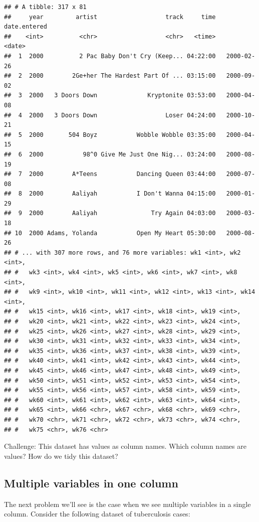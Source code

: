 \documentclass[]{book}
\theoremstyle{definition}
\theoremstyle{definition}
\theoremstyle{remark}
\begin{document}
\begin{verbatim}
## # A tibble: 317 x 81
##     year         artist                   track     time date.entered
##    <int>          <chr>                   <chr>   <time>       <date>
##  1  2000          2 Pac Baby Don't Cry (Keep... 04:22:00   2000-02-26
##  2  2000        2Ge+her The Hardest Part Of ... 03:15:00   2000-09-02
##  3  2000   3 Doors Down              Kryptonite 03:53:00   2000-04-08
##  4  2000   3 Doors Down                   Loser 04:24:00   2000-10-21
##  5  2000       504 Boyz           Wobble Wobble 03:35:00   2000-04-15
##  6  2000           98^0 Give Me Just One Nig... 03:24:00   2000-08-19
##  7  2000        A*Teens           Dancing Queen 03:44:00   2000-07-08
##  8  2000        Aaliyah           I Don't Wanna 04:15:00   2000-01-29
##  9  2000        Aaliyah               Try Again 04:03:00   2000-03-18
## 10  2000 Adams, Yolanda           Open My Heart 05:30:00   2000-08-26
## # ... with 307 more rows, and 76 more variables: wk1 <int>, wk2 <int>,
## #   wk3 <int>, wk4 <int>, wk5 <int>, wk6 <int>, wk7 <int>, wk8 <int>,
## #   wk9 <int>, wk10 <int>, wk11 <int>, wk12 <int>, wk13 <int>, wk14 <int>,
## #   wk15 <int>, wk16 <int>, wk17 <int>, wk18 <int>, wk19 <int>,
## #   wk20 <int>, wk21 <int>, wk22 <int>, wk23 <int>, wk24 <int>,
## #   wk25 <int>, wk26 <int>, wk27 <int>, wk28 <int>, wk29 <int>,
## #   wk30 <int>, wk31 <int>, wk32 <int>, wk33 <int>, wk34 <int>,
## #   wk35 <int>, wk36 <int>, wk37 <int>, wk38 <int>, wk39 <int>,
## #   wk40 <int>, wk41 <int>, wk42 <int>, wk43 <int>, wk44 <int>,
## #   wk45 <int>, wk46 <int>, wk47 <int>, wk48 <int>, wk49 <int>,
## #   wk50 <int>, wk51 <int>, wk52 <int>, wk53 <int>, wk54 <int>,
## #   wk55 <int>, wk56 <int>, wk57 <int>, wk58 <int>, wk59 <int>,
## #   wk60 <int>, wk61 <int>, wk62 <int>, wk63 <int>, wk64 <int>,
## #   wk65 <int>, wk66 <chr>, wk67 <chr>, wk68 <chr>, wk69 <chr>,
## #   wk70 <chr>, wk71 <chr>, wk72 <chr>, wk73 <chr>, wk74 <chr>,
## #   wk75 <chr>, wk76 <chr>
\end{verbatim}

Challenge: This dataset has values as column names. Which column names
are values? How do we tidy this dataset?

\subsection{Multiple variables in one
column}\label{multiple-variables-in-one-column}

The next problem we'll see is the case when we see multiple variables in
a single column. Consider the following dataset of tuberculosis cases:
\end{document}
